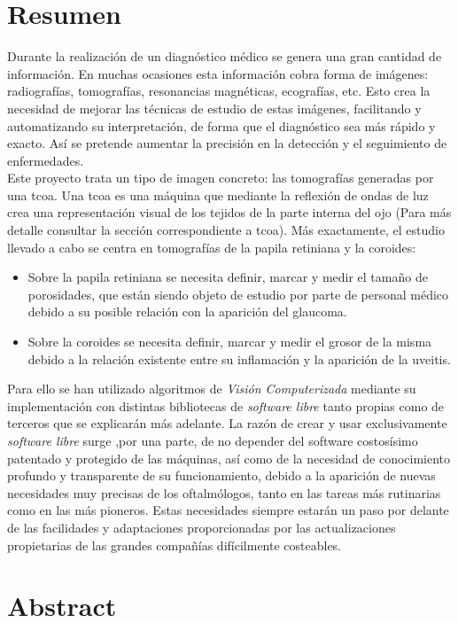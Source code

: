 \section*{Resumen}
Durante la realización de un diagnóstico médico se genera una gran
cantidad de información. En muchas ocasiones esta información cobra
forma de imágenes: radiografías, tomografías, resonancias magnéticas,
ecografías, etc. Esto crea la necesidad de mejorar las técnicas de
estudio de estas imágenes, facilitando y automatizando su
interpretación, de forma que el diagnóstico sea más rápido y
exacto. Así se pretende
aumentar la precisión en la detección y el seguimiento de enfermedades.\\
Este proyecto trata un tipo de imagen concreto: las tomografías
generadas por una \gls{tcoa}. Una \gls{tcoa} es una máquina que
mediante la reflexión de ondas de luz crea una representación visual
de los tejidos de la parte interna del ojo (Para más detalle consultar
la sección correspondiente a \gls{tcoa}). Más exactamente, el estudio
llevado a cabo se centra en tomografías de la papila retiniana y la
coroides:
\begin{itemize}
\item Sobre la papila retiniana se necesita definir, marcar y medir el
  tamaño de porosidades, que están siendo objeto de estudio por parte
  de personal médico debido a su posible relación con la aparición del
  glaucoma.
\item Sobre la coroides se necesita definir, marcar y medir el grosor
  de la misma debido a la relación existente entre su inflamación y la
  aparición de la uveitis.
\end{itemize}
Para ello se han utilizado algoritmos de \emph{Visión Computerizada}
mediante su implementación con distintas bibliotecas de \emph{software
  libre} tanto propias como de terceros que se explicarán más
adelante. La razón de crear y usar exclusivamente \emph{software libre}
surge ,por una parte, de no depender del
software costosísimo patentado y protegido de las máquinas, así como de la
necesidad de conocimiento profundo y transparente de su funcionamiento,
debido a la aparición de nuevas necesidades muy precisas de los
oftalmólogos, tanto en las tareas más rutinarias como en las más
pioneros. Estas necesidades siempre estarán un paso por delante de las
facilidades y adaptaciones proporcionadas por las actualizaciones
propietarias de las grandes compañías difícilmente costeables.
\newpage
\section*{Abstract}

